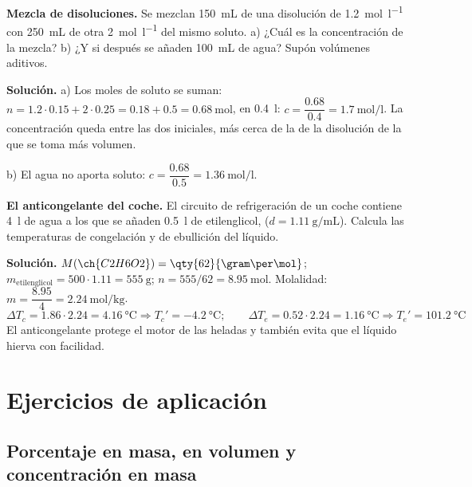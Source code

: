 \begin{example}
    \textbf{Mezcla de disoluciones.} Se mezclan \qty{150}{\mL} de una disolución de  \qty{1.2}{\mol\per\litre} con
    \qty{250}{\mL} de otra \qty{2}{\mol\per\litre} del mismo soluto. a) ¿Cuál es la concentración de la mezcla? b) ¿Y si después
    se añaden \qty{100}{\mL} de agua? Supón volúmenes aditivos.

    \textbf{Solución.} a) Los moles de soluto se suman: \(n = \num{1.2} \cdot \num{0.15} + 2 \cdot \num{0.25} = \num{0.18} + \num{0.5} = \qty{0.68}{\mol}\),
    en \qty{0.4}{\litre}: \(c = \dfrac{\num{0.68}}{\num{0.4}} = \qty{1.7}{\mol\per\litre}\). La concentración queda entre las dos
    iniciales, más cerca de la de la disolución de la que se toma más volumen.

    b) El agua no aporta soluto: \(c = \dfrac{\num{0.68}}{\num{0.5}} = \qty{1.36}{\mol\per\litre}\).
\end{example}

\begin{example}
    \textbf{El anticongelante del coche.} El circuito de refrigeración de un coche contiene \qty{4}{\litre} de agua a los que se
    añaden \qty{0.5}{\litre} de etilenglicol,  (\(d = \qty{1.11}{\gram\per\mL}\)). Calcula las temperaturas de
    congelación y de ebullición del líquido.

    \textbf{Solución.} \(M(\ch{C2H6O2}) = \qty{62}{\gram\per\mol}\); \(m_{\text{etilenglicol}} = 500 \cdot \num{1.11} = \qty{555}{\gram}\);
    \(n = 555/62 = \qty{8.95}{\mol}\). Molalidad: \(m = \dfrac{\num{8.95}}{4} = \qty{2.24}{\mol\per\kilo\gram}\).
    \[ \Delta T_c = \num{1.86} \cdot \num{2.24} = \qty{4.16}{\degreeCelsius} \Rightarrow T_c' = \qty{-4.2}{\degreeCelsius}; \qquad
    \Delta T_e = \num{0.52} \cdot \num{2.24} = \qty{1.16}{\degreeCelsius} \Rightarrow T_e' = \qty{101.2}{\degreeCelsius} \]
    El anticongelante protege el motor de las heladas y también evita que el líquido hierva con facilidad.
\end{example}

\section{Ejercicios de aplicación}\label{sec:ud2-aplicacion}

\subsection{Porcentaje en masa, en volumen y concentración en masa}


